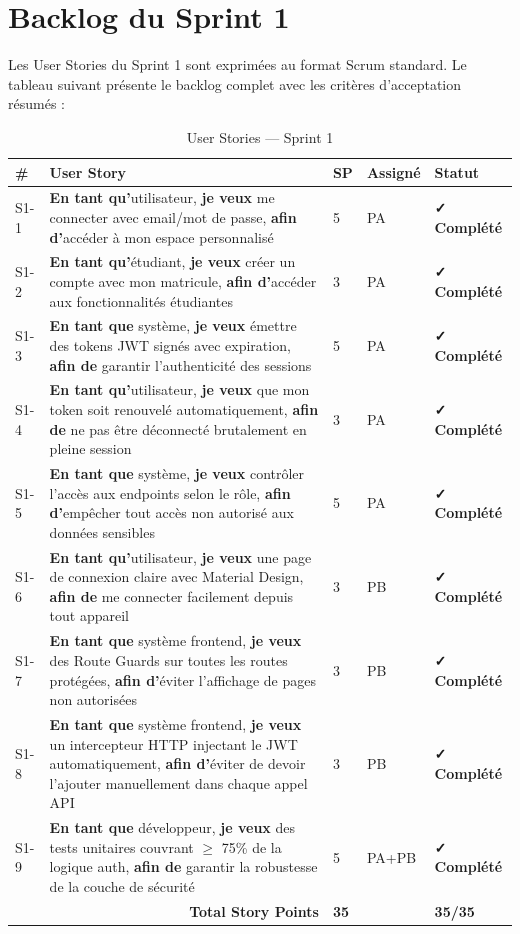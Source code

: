 \documentclass[12pt,a4paper]{report}
\begin{document}
\section{Backlog du Sprint 1}

Les User Stories du Sprint 1 sont exprimées au format Scrum standard. Le tableau suivant présente le backlog complet avec les critères d'acceptation résumés :

\begin{table}[H]
\centering
\caption{User Stories — Sprint 1}
\begin{tabular}{|p{0.4cm}|p{7cm}|p{1.5cm}|p{1.5cm}|p{2.5cm}|}
\hline
\textbf{\#} & \textbf{User Story} & \textbf{SP} & \textbf{Assigné} & \textbf{Statut} \\
\hline
S1-1 & \textbf{En tant qu'}utilisateur, \textbf{je veux} me connecter avec email/mot de passe, \textbf{afin d'}accéder à mon espace personnalisé & 5 & PA & \textbf{✓ Complété} \\
\hline
S1-2 & \textbf{En tant qu'}étudiant, \textbf{je veux} créer un compte avec mon matricule, \textbf{afin d'}accéder aux fonctionnalités étudiantes & 3 & PA & \textbf{✓ Complété} \\
\hline
S1-3 & \textbf{En tant que} système, \textbf{je veux} émettre des tokens JWT signés avec expiration, \textbf{afin de} garantir l'authenticité des sessions & 5 & PA & \textbf{✓ Complété} \\
\hline
S1-4 & \textbf{En tant qu'}utilisateur, \textbf{je veux} que mon token soit renouvelé automatiquement, \textbf{afin de} ne pas être déconnecté brutalement en pleine session & 3 & PA & \textbf{✓ Complété} \\
\hline
S1-5 & \textbf{En tant que} système, \textbf{je veux} contrôler l'accès aux endpoints selon le rôle, \textbf{afin d'}empêcher tout accès non autorisé aux données sensibles & 5 & PA & \textbf{✓ Complété} \\
\hline
S1-6 & \textbf{En tant qu'}utilisateur, \textbf{je veux} une page de connexion claire avec Material Design, \textbf{afin de} me connecter facilement depuis tout appareil & 3 & PB & \textbf{✓ Complété} \\
\hline
S1-7 & \textbf{En tant que} système frontend, \textbf{je veux} des Route Guards sur toutes les routes protégées, \textbf{afin d'}éviter l'affichage de pages non autorisées & 3 & PB & \textbf{✓ Complété} \\
\hline
S1-8 & \textbf{En tant que} système frontend, \textbf{je veux} un intercepteur HTTP injectant le JWT automatiquement, \textbf{afin d'}éviter de devoir l'ajouter manuellement dans chaque appel API & 3 & PB & \textbf{✓ Complété} \\
\hline
S1-9 & \textbf{En tant que} développeur, \textbf{je veux} des tests unitaires couvrant $\geq$ 75\% de la logique auth, \textbf{afin de} garantir la robustesse de la couche de sécurité & 5 & PA+PB & \textbf{✓ Complété} \\
\hline
\multicolumn{2}{|r|}{\textbf{Total Story Points}} & \textbf{35} & & \textbf{35/35} \\
\hline
\end{tabular}
\end{table}
\end{document}
